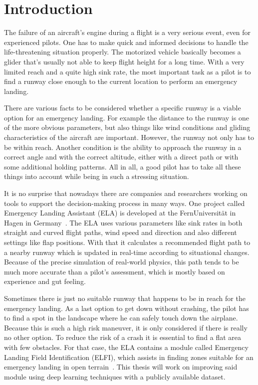 \section{Introduction}
The failure of an aircraft's engine during a flight is a very serious event, even for experienced pilots. One has to make quick and informed decisions to handle the life-threatening situation properly. The motorized vehicle basically becomes a glider that's usually not able to keep flight height for a long time. With a very limited reach and a quite high sink rate, the most important task as a pilot is to find a runway close enough to the current location to perform an emergency landing.

There are various facts to be considered whether a specific runway is a viable option for an emergency landing. For example the distance to the runway is one of the more obvious parameters, but also things like wind conditions and gliding characteristics of the aircraft are important. However, the runway not only has to be within reach. Another condition is the ability to approach the runway in a correct angle and with the correct altitude, either with a direct path or with some additional holding patterns. All in all, a good pilot has to take all these things into account while being in such a stressing situation.

It is no surprise that nowadays there are companies and researchers working on tools to support the decision-making process in many ways. One project called Emergency Landing Assistant (ELA) is developed at the FernUniversität in Hagen in Germany~\cite{feu_fas}. The ELA uses various parameters like sink rates in both straight and curved flight paths, wind speed and direction and also different settings like flap positions. With that it calculates a recommended flight path to a nearby runway which is updated in real-time according to situational changes. Because of the precise simulation of real-world physics, this path tends to be much more accurate than a pilot's assessment, which is mostly based on experience and gut feeling.

Sometimes there is just no suitable runway that happens to be in reach for the emergency landing. As a last option to get down without crashing, the pilot has to find a spot in the landscape where he can safely touch down the airplane. Because this is such a high risk maneuver, it is only considered if there is really no other option. To reduce the risk of a crash it is essential to find a flat area with few obstacles. For that case, the ELA contains a module called Emergency Landing Field Identification (ELFI), which assists in finding zones suitable for an emergency landing in open terrain~\cite{feu_elfi}. This thesis will work on improving said module using deep learning techniques with a publicly available dataset.

